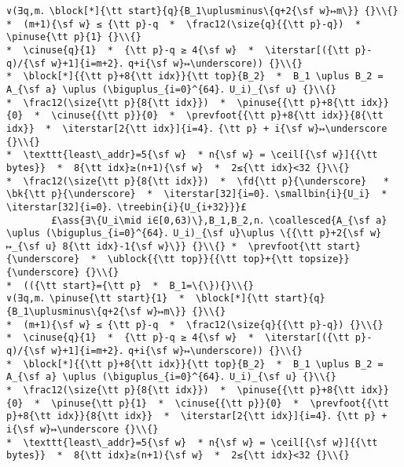 \documentclass[10pt,twoside]{report}
\makeatletter
\newcommand{\ml}[2][t]{\mbox{\mdseries\begin{tabular}[#1]{@{}L@{}}#2\end{tabular}}}
\newcommand{\ass}[1]{\ensuremath{{\color{blue}\left\{\ml[c]{#1}\right\}}}}
\renewcommand{\ceil}[2][]{\left\lceil{#2}\right\rceil_{#1}}
\newcommand{\iterstar}[2][]{\text{\LARGE $*$}^{#1}_{#2}}
\makeatother
\begin{document}
\begin{lstlisting}
∨(∃q,m．\block[*]{\tt start}{q}{B_1\uplusminus\{q+2{\sf w}↦m\}} {}\\{}
*  (m+1){\sf w} ≤ {\tt p}-q  *  \frac12(\size{q}{{\tt p}-q})  *  \pinuse{\tt p}{1} {}\\{}
*  \cinuse{q}{1}  *  {\tt p}-q ≥ 4{\sf w}  *  \iterstar[({\tt p}-q)/{\sf w}+1]{i=m+2}．q+i{\sf w}↦\underscore)) {}\\{}
*  \block[*]{{\tt p}+8{\tt idx}}{\tt top}{B_2}  *  B_1 \uplus B_2 = A_{\sf a} \uplus (\biguplus_{i=0}^{64}．U_i)_{\sf u} {}\\{}
*  \frac12(\size{\tt p}{8{\tt idx}})  *  \pinuse{{\tt p}+8{\tt idx}}{0}  *  \cinuse{{\tt p}}{0}  *  \prevfoot{{\tt p}+8{\tt idx}}{8{\tt idx}}  *  \iterstar[2{\tt idx}]{i=4}．{\tt p} + i{\sf w}↦\underscore {}\\{}
*  \texttt{least\_addr}=5{\sf w}  * n{\sf w} = \ceil[{\sf w}]{{\tt bytes}}  *  8{\tt idx}≥(n+1){\sf w}  *  2≤{\tt idx}<32 {}\\{}
*  \frac12(\size{\tt p}{8{\tt idx}})  *  \fd{\tt p}{\underscore}   *  \bk{\tt p}{\underscore}  *  \iterstar[32]{i=0}．\smallbin{i}{U_i}  *  \iterstar[32]{i=0}．\treebin{i}{U_{i+32}}}£ 
        £\ass{∃\{U_i\mid i∈[0,63)\},B_1,B_2,n．\coallesced{A_{\sf a} \uplus (\biguplus_{i=0}^{64}．U_i)_{\sf u}\uplus \{{\tt p}+2{\sf w}↦_{\sf u} 8{\tt idx}-1{\sf w}\}} {}\\{} *  \prevfoot{\tt start}{\underscore}  *  \ublock{{\tt top}}{{\tt top}+{\tt topsize}}{\underscore} {}\\{}
*  (({\tt start}={\tt p}  *  B_1=\{\}){}\\{}
∨(∃q,m．\pinuse{\tt start}{1}  *  \block[*]{\tt start}{q}{B_1\uplusminus\{q+2{\sf w}↦m\}} {}\\{}
*  (m+1){\sf w} ≤ {\tt p}-q  *  \frac12(\size{q}{{\tt p}-q}) {}\\{}
*  \cinuse{q}{1}  *  {\tt p}-q ≥ 4{\sf w}  *  \iterstar[({\tt p}-q)/{\sf w}+1]{i=m+2}．q+i{\sf w}↦\underscore)) {}\\{}
*  \block[*]{{\tt p}+8{\tt idx}}{\tt top}{B_2}  *  B_1 \uplus B_2 = A_{\sf a} \uplus (\biguplus_{i=0}^{64}．U_i)_{\sf u} {}\\{}
*  \frac12(\size{\tt p}{8{\tt idx}})  *  \pinuse{{\tt p}+8{\tt idx}}{0}  *  \pinuse{\tt p}{1}  *  \cinuse{{\tt p}}{0}  *  \prevfoot{{\tt p}+8{\tt idx}}{8{\tt idx}}  *  \iterstar[2{\tt idx}]{i=4}．{\tt p} + i{\sf w}↦\underscore {}\\{}
*  \texttt{least\_addr}=5{\sf w}  * n{\sf w} = \ceil[{\sf w}]{{\tt bytes}}  *  8{\tt idx}≥(n+1){\sf w}  *  2≤{\tt idx}<32 {}\\{}

\end{lstlisting}
\end{document}
